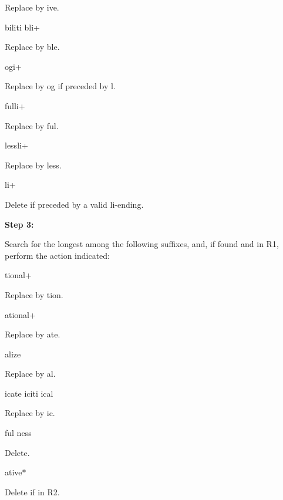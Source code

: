 \begin{DoxyItemize}
\begin{DoxyItemize}
\item Replace by ive.
\end{DoxyItemize}
\item biliti bli+
\begin{DoxyItemize}
\item Replace by ble.
\end{DoxyItemize}
\item ogi+
\begin{DoxyItemize}
\item Replace by og if preceded by l.
\end{DoxyItemize}
\item fulli+
\begin{DoxyItemize}
\item Replace by ful.
\end{DoxyItemize}
\item lessli+
\begin{DoxyItemize}
\item Replace by less.
\end{DoxyItemize}
\item li+
\begin{DoxyItemize}
\item Delete if preceded by a valid li-\/ending.
\end{DoxyItemize}
\end{DoxyItemize}

{\bfseries Step 3\-:}

Search for the longest among the following suffixes, and, if found and in R1, perform the action indicated\-:
\begin{DoxyItemize}
\item tional+
\begin{DoxyItemize}
\item Replace by tion.
\end{DoxyItemize}
\item ational+
\begin{DoxyItemize}
\item Replace by ate.
\end{DoxyItemize}
\item alize
\begin{DoxyItemize}
\item Replace by al.
\end{DoxyItemize}
\item icate iciti ical
\begin{DoxyItemize}
\item Replace by ic.
\end{DoxyItemize}
\item ful ness
\begin{DoxyItemize}
\item Delete.
\end{DoxyItemize}
\item ative$\ast$
\begin{DoxyItemize}
\item Delete if in R2.
\end{DoxyItemize}
\end{DoxyItemize}

